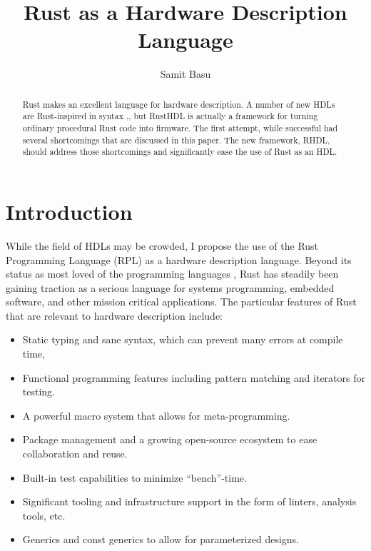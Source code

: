 \documentclass[sigplan,screen,sigconf]{acmart}
\author{Samit Basu}
\affiliation{
  basu.samit@gmail.com
  \country{Fremont CA, USA}
}
\begin{document}
\title{Rust as a Hardware Description Language}

\begin{abstract}
Rust \cite{b9} makes an excellent language for hardware description.  A number of new HDLs are 
Rust-inspired in syntax \cite{b1},\cite{b4},
but RustHDL\cite{b6} is actually a framework for turning ordinary procedural Rust code into firmware.  The first attempt,
while successful had several shortcomings that are discussed in this paper.  The new framework, RHDL\cite{b10},
should address those shortcomings and significantly ease the use of Rust as an HDL.
\end{abstract}

\maketitle

\section{Introduction}

While the field of HDLs may be crowded, I propose the use of the Rust Programming Language (RPL)
as a hardware description language.  Beyond its status as most loved of the programming languages \cite{b0},
Rust has steadily been gaining traction as a serious language for systems programming, embedded 
software, and other mission critical applications.  The particular features of Rust that are 
relevant to hardware description include:
\begin{itemize}
\item Static typing and sane syntax, which can prevent many errors at compile time,
\item Functional programming features including pattern matching and iterators for testing.
\item A powerful macro system that allows for meta-programming.
\item Package management and a growing open-source ecosystem to ease collaboration and reuse.
\item Built-in test capabilities to minimize ``bench''-time.
\item Significant tooling and infrastructure support in the form of linters, analysis tools, etc.
\item Generics and const generics to allow for parameterized designs.
\end{itemize}
\end{document}
